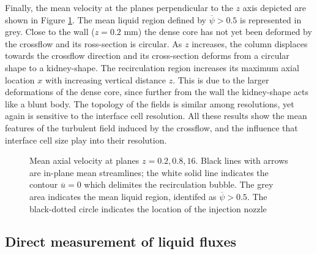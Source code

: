 Finally, the mean velocity at the planes perpendicular to the $z$ axis depicted are shown in Figure \ref{fig:JICF_turbulent_structures_planes_z}.  The mean liquid region defined by $\overline{\psi} > 0.5$ is represented in grey. Close to the wall ($z = 0.2$ mm) the dense core has not yet been deformed by the crossflow and its ross-section is circular. As $z$ increases, the column displaces towards the crossflow direction and its cross-section deforms from a circular shape to a kidney-shape. The recirculation region increases its maximum axial location $x$ with increasing vertical distance $z$. This is due to the larger deformations of the dense core, since further from the wall the kidney-shape acts like a blunt body. The topology of the fields is similar among resolutions, yet again is sensitive to the interface cell resolution. All these results show the mean features of the turbulent field induced by the crossflow, and the influence that  interface cell size play into their resolution. 




\clearpage



\begin{figure}[ht]
\centering
\caption[Mean axial velocity at planes $z = 0.2, 0.8, 16$ mm]{Mean axial velocity at planes $z = 0.2, 0.8, 16$. Black lines with arrows are in-plane mean streamlines; the white solid line indicates the contour $\overline{u} = 0$ which delimites the recirculation bubble. The grey area  indicates the mean liquid region, identifed as $\overline{\psi} > 0.5$. The black-dotted circle indicates the location of the injection nozzle}
\label{fig:JICF_turbulent_structures_planes_z}
\end{figure}




\clearpage

\subsection{Direct measurement of liquid fluxes}
\label{subsec:ch5_direct_measurement_fluxes_IB}

